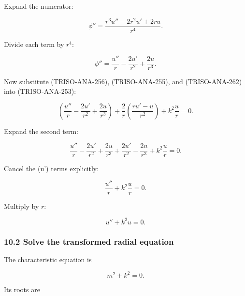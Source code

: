 \documentclass[11pt,a4paper]{article}
\begin{document}
Expand the numerator:

\begin{equation}
\phi''
=
\frac{r^3u''-2r^2u'+2ru}{r^4}.
\tag{TRISO-ANA-261}
\label{eq:triso-ana-261}
\end{equation}

Divide each term by $r^4$:

\begin{equation}
\phi''
=
\frac{u''}{r}
-
\frac{2u'}{r^2}
+
\frac{2u}{r^3}.
\tag{TRISO-ANA-262}
\label{eq:triso-ana-262}
\end{equation}

Now substitute (TRISO-ANA-256), (TRISO-ANA-255), and (TRISO-ANA-262) into (TRISO-ANA-253):

\begin{equation}
\left(
\frac{u''}{r}
-
\frac{2u'}{r^2}
+
\frac{2u}{r^3}
\right)
+
\frac2r
\left(
\frac{ru'-u}{r^2}
\right)
+
k^2\frac{u}{r}
=
0.
\tag{TRISO-ANA-263}
\label{eq:triso-ana-263}
\end{equation}

Expand the second term:

\begin{equation}
\frac{u''}{r}
-
\frac{2u'}{r^2}
+
\frac{2u}{r^3}
+
\frac{2u'}{r^2}
-
\frac{2u}{r^3}
+
k^2\frac{u}{r}
=
0.
\tag{TRISO-ANA-264}
\label{eq:triso-ana-264}
\end{equation}

Cancel the (u') terms explicitly:

\begin{equation}
\frac{u''}{r}
+
k^2\frac{u}{r}
=
0.
\tag{TRISO-ANA-265}
\label{eq:triso-ana-265}
\end{equation}

Multiply by $r$:

\begin{equation}
\boxed{
u''+k^2u=0.
}
\tag{TRISO-ANA-266}
\label{eq:triso-ana-266}
\end{equation}

\subsubsection*{10.2 Solve the transformed radial equation}

The characteristic equation is

\begin{equation}
m^2+k^2=0.
\tag{TRISO-ANA-267}
\label{eq:triso-ana-267}
\end{equation}

Its roots are
\end{document}
